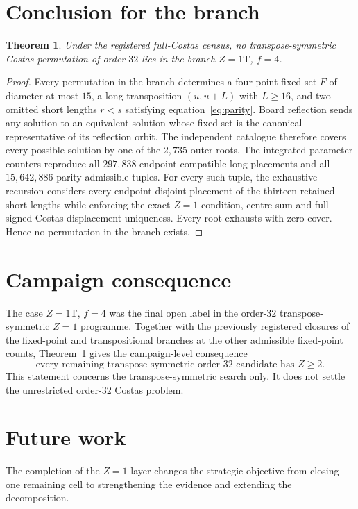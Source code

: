 \documentclass[11pt,a4paper]{article}
\newtheorem{theorem}{Theorem}[section]\newtheorem{lemma}[theorem]{Lemma}\newtheorem{proposition}[theorem]{Proposition}
\theoremstyle{definition}\newtheorem{definition}[theorem]{Definition}\newtheorem{remark}[theorem]{Remark}
\begin{document}
\section{Conclusion for the branch}
\begin{theorem}\label{thm:main}
Under the registered full-Costas census, no transpose-symmetric Costas permutation of order $32$ lies in the branch $Z=1\mathrm T$, $f=4$.
\end{theorem}

\begin{proof}
Every permutation in the branch determines a four-point fixed set $F$ of diameter at most $15$, a long transposition $(u,u+L)$ with $L\ge16$, and two omitted short lengths $r<s$ satisfying equation~\eqref{eq:parity}.  Board reflection sends any solution to an equivalent solution whose fixed set is the canonical representative of its reflection orbit.  The independent catalogue therefore covers every possible solution by one of the $2{,}735$ outer roots.  The integrated parameter counters reproduce all $297{,}838$ endpoint-compatible long placements and all $15{,}642{,}886$ parity-admissible tuples.  For every such tuple, the exhaustive recursion considers every endpoint-disjoint placement of the thirteen retained short lengths while enforcing the exact $Z=1$ condition, centre sum and full signed Costas displacement uniqueness.  Every root exhausts with zero cover.  Hence no permutation in the branch exists.
\end{proof}

\section{Campaign consequence}
The case $Z=1\mathrm T$, $f=4$ was the final open label in the order-$32$ transpose-symmetric $Z=1$ programme.  Together with the previously registered closures of the fixed-point and transpositional branches at the other admissible fixed-point counts, Theorem~\ref{thm:main} gives the campaign-level consequence
\[
\boxed{\text{every remaining transpose-symmetric order-$32$ candidate has }Z\ge2.}
\]
This statement concerns the transpose-symmetric search only.  It does not settle the unrestricted order-$32$ Costas problem.

\section{Future work}
The completion of the $Z=1$ layer changes the strategic objective from closing one remaining cell to strengthening the evidence and extending the decomposition.
\end{document}
